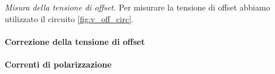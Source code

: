 \emph{Misura della tensione di offset.}
Per misurare la tensione di offset abbiamo utilizzato il circuito \ref{fig:v_off_circ}.

\paragraph{Correzione della tensione di offset}

\paragraph{Correnti di polarizzazione}

